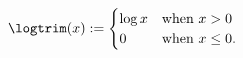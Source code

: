 \begin{defn}
%
\begin{align*}
%
\logtrim(x) :=
\begin{cases}
    \log x  &\textrm{when }x > 0 \\
    0       &\textrm{when }x \le 0.
\end{cases}
%
\end{align*}
%
%
%
\end{defn}
